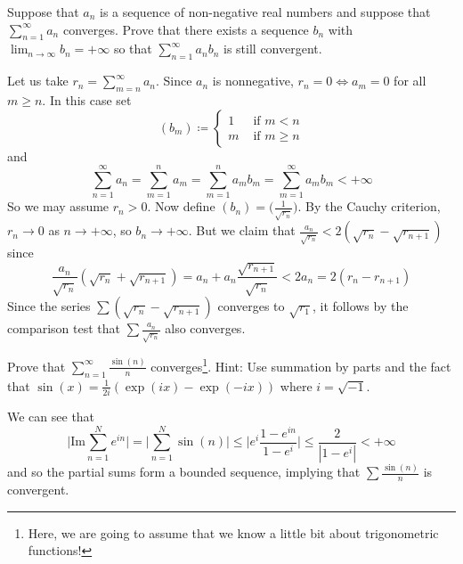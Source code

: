   \begin{exercise}
    Suppose that $a_n$ is a sequence of non-negative real numbers and suppose that $\sum_{n=1}^{\infty} a_n$ converges. Prove that there exists a sequence $b_n$ with $\lim_{n \to \infty} b_n = +\infty$ so that $\sum_{n=1}^{\infty} a_n b_n$ is still convergent.
  \end{exercise}
  \begin{solution}
    Let us take $r_n = \sum_{m=n}^\infty a_n$. Since $a_n$ is nonnegative, $r_n = 0 \iff a_m = 0$ for all $m \geq n$. In this case set 
    \begin{equation}
      (b_m) \coloneqq \begin{cases}
        1 & \text{ if } m < n \\ 
        m & \text{ if } m \geq n
      \end{cases}
    \end{equation}
    and 
    \begin{equation}
      \sum_{n=1}^\infty a_n = \sum_{m=1}^n a_m = \sum_{m=1}^n a_m b_m = \sum_{m=1}^\infty a_m b_m < +\infty 
    \end{equation}
    So we may assume $r_n > 0$. Now define $(b_n) = \big( \frac{1}{\sqrt{r_n}} \big)$. By the Cauchy criterion, $r_n \to 0$ as $n \to +\infty$, so $b_n \to +\infty$. But we claim that $\frac{a_n}{\sqrt{r_n}} < 2(\sqrt{r_n} - \sqrt{r_{n+1}})$ since 
    \begin{equation}
      \frac{a_n}{\sqrt{r_n}} (\sqrt{r_n} + \sqrt{r_{n+1}}) = a_n + a_n \frac{\sqrt{r_{n+1}}}{\sqrt{r_n}} < 2 a_n = 2(r_n - r_{n+1})  
    \end{equation}
    Since the series $\sum (\sqrt{r_n} - \sqrt{r_{n+1}})$ converges to $\sqrt{r_1}$, it follows by the comparison test that $\sum \frac{a_n}{\sqrt{r_n}}$ also converges. 
  \end{solution}

  \begin{exercise}
    Prove that $\sum_{n=1}^{\infty} \frac{\sin(n)}{n}$ converges\footnote{Here, we are going to assume that we know a little bit about trigonometric functions!}. Hint: Use summation by parts and the fact that $\sin(x) = \frac{1}{2i}(\exp(ix) - \exp(-ix))$ where $i = \sqrt{-1}$.
  \end{exercise}
  \begin{solution}
    We can see that 
    \begin{equation}
      \bigg| \mathrm{Im} \sum_{n=1}^N e^{in} \bigg| = \bigg| \sum_{n=1}^N \sin(n) \bigg| \leq \bigg| e^i \frac{1 - e^{in}}{1 - e^i} \bigg| \leq \frac{2}{|1 - e^i|} < +\infty
    \end{equation} 
    and so the partial sums form a bounded sequence, implying that $\sum \frac{\sin(n)}{n}$ is convergent. 
  \end{solution}

